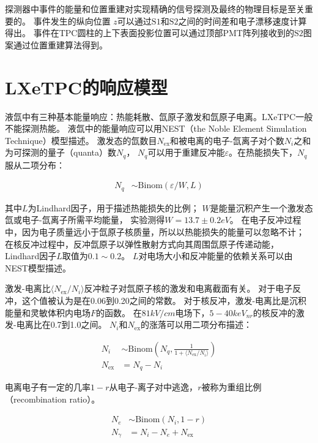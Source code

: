 探测器中事件的能量和位置重建对实现精确的信号探测及最终的物理目标是至关重要的。
事件发生的纵向位置 $z$可以通过$\mathrm{S1}$和$\mathrm{S2}$之间的时间差和电子漂移速度计算得出。
事件在TPC圆柱的上下表面投影位置可以通过顶部PMT阵列接收到的$\mathrm{S2}$图案通过位置重建算法得到。

\section{LXeTPC的响应模型}
\label{sec:basic_response}

液氙中有三种基本能量响应：热能耗散、氙原子激发和氙原子电离。LXeTPC一般不能探测热能。
液氙中的能量响应可以用NEST（the Noble Element Simulation Technique）模型描述\cite{szydagis_nest_2011,lenardo_global_2015}。
激发态的氙数目$N_{\mathrm{ex}}$和被电离的电子-氙离子对个数$N_i$之和为可探测的量子（quanta）数$N_q$，
$N_q$可以用于重建反冲能$\varepsilon $。在热能损失下，$N_q$服从二项分布：

\begin{align}
    \label{eq:N_q}
    N_q &\sim \mathrm{Binom}\left(\varepsilon /W,L\right)
\end{align}

其中$L$为Lindhard因子，用于描述热能损失的比例；
$W$是能量沉积产生一个激发态氙或电子-氙离子所需平均能量，
实验测得$W=13.7\pm0.2\si{eV}$\cite{szydagis_nest_2011}。
在电子反冲过程中，因为电子质量远小于氙原子核质量，所以以热能损失的能量可以忽略不计；
在核反冲过程中，反冲氙原子以弹性散射方式向其周围氙原子传递动能，Lindhard因子$L$取值为$0.1\sim0.2$。
$L$对电场大小和反冲能量的依赖关系可以由NEST模型描述。

激发-电离比$\langle N_{\mathrm{ex}}/N_i\rangle$反冲粒子对氙原子核的激发和电离截面有关。
对于电子反冲，这个值被认为是在0.06到0.20之间的常数。
对于核反冲，激发-电离比是沉积能量和灵敏体积内电场$F$的函数\cite{lenardo_global_2015}。
在$81\si{kV/cm}$电场下，$5-40\si{keV_{nr}}$的核反冲的激发-电离比在0.7到1.0之间。
$N_i$和$N_{\mathrm{ex}}$的涨落可以用二项分布描述：

\begin{align}
    \label{eq:N_iex}
    N_i &\sim \mathrm{Binom}\left(N_q,\frac{1}{1+\langle N_{\mathrm{ex}}/N_{i}\rangle}\right) \\
    N_{\mathrm{ex}} &= N_q - N_i
\end{align}

电离电子有一定的几率$1-r$从电子-离子对中逃逸，$r$被称为重组比例（\mbox{recombination} ratio）。

\begin{align}
    \label{eq:N_er}
    N_e &\sim \mathrm{Binom}\left(N_i,1-r\right) \\
    N_\gamma &= N_i - N_e + N_{\mathrm{ex}}
\end{align}

